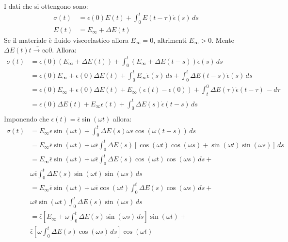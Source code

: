 I dati che si ottengono sono:
\begin{equation}
\begin{split}
\sigma(t) &= \epsilon(0)E(t) + \int_0^t{E(t-\tau)\dot{\epsilon}(s)\,ds}\\
E(t) &= E_{\infty} + \Delta E(t)
\end{split}
\end{equation}
Se il materiale è fluido viscoelastico allora $E_{\infty} = 0$, altrimenti $E_{\infty} > 0$.
Mente $\Delta E(t) \underrightarrow{t \rightarrow \infty} 0$.
Allora:
\begin{equation}
\begin{split}
\sigma(t) &= \epsilon(0)(E_{\infty} + \Delta E(t)) + \int_0^t{(E_{\infty} + \Delta E(t-s)) \dot{\epsilon}(s)\,ds}\\
&= \epsilon(0)E_{\infty} + \epsilon(0)\Delta E(t) + \int_0^t{E_{\infty}\dot{\epsilon}(s)\,ds} +  \int_0^t{\Delta E(t-s) \dot{\epsilon}(s)\,ds}\\
&= \epsilon(0)E_{\infty} + \epsilon(0)\Delta E(t) + E_{\infty}(\epsilon(t) - \epsilon(0)) + \int_t^0{\Delta E(\tau) \dot{\epsilon}(t-\tau)\,-d\tau}\\
&= \epsilon(0)\Delta E(t) + E_{\infty}\epsilon(t) + \int_0^t{\Delta E(s) \dot{\epsilon}(t-s)\,ds}\\
\end{split}
\end{equation}
Imponendo che $\epsilon(t) = \bar{\epsilon}\sin(\omega t)$ allora:
\begin{equation}
\begin{split}
\sigma(t) &= E_{\infty} \bar{\epsilon}\sin(\omega t) + \int_0^t{\Delta E(s)\omega\bar{\epsilon}\cos(\omega(t-s))\,ds}\\
&= E_{\infty} \bar{\epsilon}\sin(\omega t) + \omega\bar{\epsilon}\int_0^t{\Delta E(s) \left[\cos(\omega t)\cos(\omega s) + \sin(\omega t)\sin(\omega s)\right]\,ds}\\
&= E_{\infty} \bar{\epsilon}\sin(\omega t) + \omega\bar{\epsilon}\int_0^t{\Delta E(s) \cos(\omega t)\cos(\omega s)\,ds} +\\
&\omega\bar{\epsilon}\int_0^t{\Delta E(s)\sin(\omega t)\sin(\omega s)\,ds}\\
&= E_{\infty} \bar{\epsilon}\sin(\omega t) + \omega\bar{\epsilon}\cos(\omega t)\int_0^t{\Delta E(s) \cos(\omega s)\,ds} +\\
&\omega\bar{\epsilon}\sin(\omega t)\int_0^t{\Delta E(s)\sin(\omega s)\,ds}\\
&= \bar{\epsilon}\left[E_{\infty} + \omega\int_0^t{\Delta E(s)\sin(\omega s)\,ds}\right]\sin(\omega t) +\\
&\bar{\epsilon}\left[\omega\int_0^t{\Delta E(s)\cos(\omega s)\,ds}\right]\cos(\omega t)
\end{split}
\end{equation}

